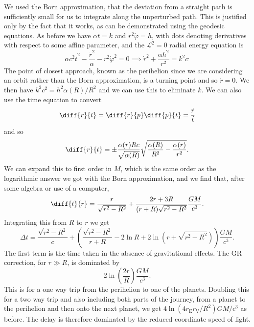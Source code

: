 \documentclass[fleqn]{NotesClass}
\newcommand*{\lagrangian}{\mathcal{L}}
\begin{document}
    We used the Born approximation, that the deviation from a straight path is sufficiently small for us to integrate along the unperturbed path.
    This is justified only by the fact that it works, as can be demonstrated using the geodesic equations.
    As before we have \(\alpha\dot{t} = k\) and \(r^2\dot{\varphi} = h\), with dots denoting derivatives with respect to some affine parameter, and the \(\lagrangian^2 = 0\) radial energy equation is
    \begin{equation}
        \alpha c^2 \dot{t}^2 - \frac{\dot{r}^2}{\alpha} - r^2\dot{\varphi}^2 = 0 \implies \dot{r}^2 + \frac{\alpha h^2}{r^2} = k^2c^.
    \end{equation}
    The point of closest approach, known as the perihelion since we are considering an orbit rather than the Born approximation, is a turning point and so \(\dot{r} = 0\).
    We then have \(k^2c^2 = h^2 \alpha(R)/R^2\) and we can use this to eliminate \(k\).
    We can also use the time equation to convert
    \begin{equation}
        \diff{r}{t} = \diff{r}{p} \diff{p}{t} = \frac{\dot{r}}{\dot{t}}
    \end{equation}
    and so
    \begin{equation}
        \diff{r}{t} = \pm \frac{\alpha(r)Rc}{\sqrt{\alpha(R)}} \sqrt{\frac{\alpha(R)}{R^2} - \frac{\alpha(r)}{r^2}}.
    \end{equation}
    We can expand this to first order in \(M\), which is the same order as the logarithmic answer we got with the Born approximation, and we find that, after some algebra or use of a computer,
    \begin{equation}
        \diff{t}{r} = \frac{r}{\sqrt{r^2 - R^2}} + \frac{2r + 3R}{(r + R)\sqrt{r^2 - R^2}} \frac{GM}{c^3}.
    \end{equation}
    Integrating this from \(R\) to \(r\) we get
    \begin{equation}
        \Delta t = \frac{\sqrt{r^2 - R^2}}{c} + \left( \frac{\sqrt{r^2 - R^2}}{r + R} - 2\ln R + 2\ln (r + \sqrt{r^2 - R^2}) \right) \frac{GM}{c^3}.
    \end{equation}
    The first term is the time taken in the absence of gravitational effects. The GR correction, for \(r \gg R\), is dominated by
    \begin{equation}
        2\ln\left( \frac{2r}{R} \right)\frac{GM}{c^3}.
    \end{equation}
    This is for a one way trip from the perihelion to one of the planets.
    Doubling this for a two way trip and also including both parts of the journey, from a planet to the perihelion and then onto the next planet, we get \(4\ln(4r_{\mathrm{E}}r_{\mathrm{V}}/R^2)GM/c^3\) as before.
    The delay is therefore dominated by the reduced coordinate speed of light.
    
\end{document}
